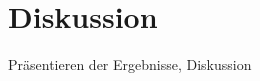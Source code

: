%
%
% 
% 
% 


\chapter{Diskussion}
\label{chap:discussion}

Präsentieren der Ergebnisse, Diskussion

